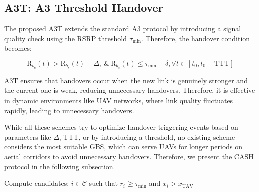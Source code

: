 \documentclass[conference]{IEEEtran}
\begin{document}
\subsection{A3T: A3 Threshold Handover}

The proposed A3T extends the standard A3 protocol by introducing a signal quality check using the RSRP threshold $\tau_{\min}$. Therefore, the handover condition becomes:

\begin{equation}
\label{a3teq}
\text{R}_{b_c}(t) > \text{R}_{b_s}(t) + \Delta, \: \text{\&} \: \text{R}_{b_s}(t) \leq \tau_{\min} + \delta,  \forall t \in [t_0, t_0 + \mathrm{TTT}]
\end{equation}

A3T ensures that handovers occur when the new link is genuinely stronger and the current one is weak, reducing unnecessary handovers. Therefore, it is effective in dynamic environments like UAV networks, where link quality fluctuates rapidly, leading to unnecessary handovers.

While all these schemes try to optimize handover-triggering events based on parameters like $\Delta$, TTT, or by introducing a threshold, no existing scheme considers the most suitable GBS, which can serve UAVs for longer periods on aerial corridors to avoid unnecessary handovers. Therefore, we present the CASH protocol in the following subsection.   



\begin{algorithm}[!t]
\caption{CASH: Context-Aware Smart Handover}


Compute candidates: $i \in \mathcal{C}$ such that $r_i \geq \tau_{\min}$ and $x_i > x_{\text{UAV}}$\;


\end{algorithm}
\end{document}
